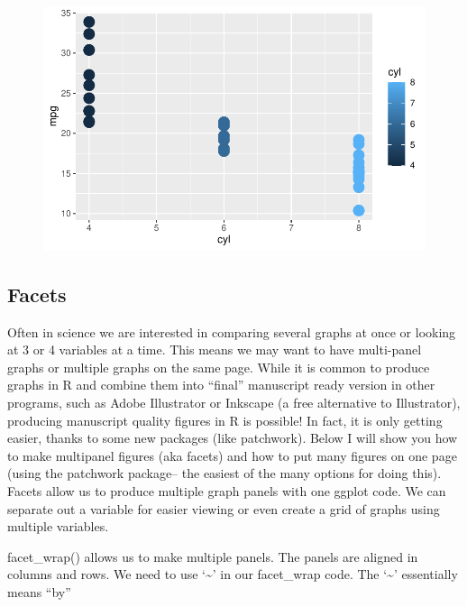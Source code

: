 \documentclass[
  letterpaper,
  DIV=11,
  numbers=noendperiod]{scrartcl}
\begin{document}
\begin{figure}[H]

{\centering \includegraphics{Lab_2_files/figure-pdf/unnamed-chunk-32-1.pdf}

}

\end{figure}

\subsection{\texorpdfstring{\textbf{Facets}}{Facets}}

Often in science we are interested in comparing several graphs at once
or looking at 3 or 4 variables at a time. This means we may want to have
multi-panel graphs or multiple graphs on the same page. While it is
common to produce graphs in R and combine them into ``final'' manuscript
ready version in other programs, such as Adobe Illustrator or Inkscape
(a free alternative to Illustrator), producing manuscript quality
figures in R is possible! In fact, it is only getting easier, thanks to
some new packages (like patchwork). Below I will show you how to make
multipanel figures (aka facets) and how to put many figures on one page
(using the patchwork package-- the easiest of the many options for doing
this).\\
Facets allow us to produce multiple graph panels with one ggplot code.
We can separate out a variable for easier viewing or even create a grid
of graphs using multiple variables.

facet\_wrap() allows us to make multiple panels. The panels are aligned
in columns and rows. We need to use `\textasciitilde{}' in our
facet\_wrap code. The `\textasciitilde{}' essentially means ``by''
\end{document}
